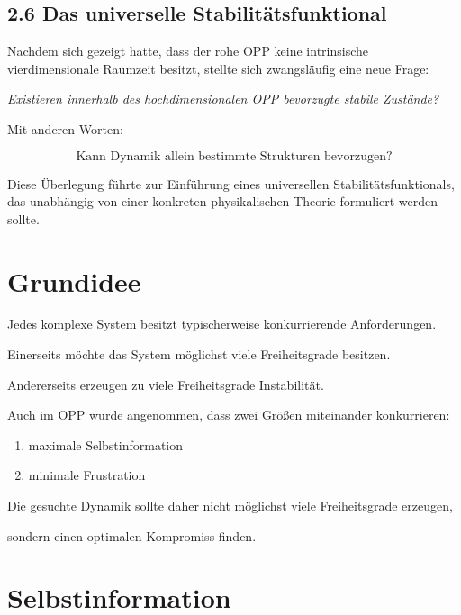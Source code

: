 \subsection{2.6 Das universelle Stabilitätsfunktional}

Nachdem sich gezeigt hatte, dass der rohe OPP keine intrinsische vierdimensionale Raumzeit besitzt, stellte sich zwangsläufig eine neue Frage:

\begin{center}
\emph{Existieren innerhalb des hochdimensionalen OPP bevorzugte stabile Zustände?}
\end{center}

Mit anderen Worten:

\[
\boxed{
\text{Kann Dynamik allein bestimmte Strukturen bevorzugen?}
}
\]

Diese Überlegung führte zur Einführung eines universellen Stabilitätsfunktionals, das unabhängig von einer konkreten physikalischen Theorie formuliert werden sollte.


\section*{Grundidee}

Jedes komplexe System besitzt typischerweise konkurrierende Anforderungen.

Einerseits möchte das System möglichst viele Freiheitsgrade besitzen.

Andererseits erzeugen zu viele Freiheitsgrade Instabilität.

Auch im OPP wurde angenommen, dass zwei Größen miteinander konkurrieren:

\begin{enumerate}

\item maximale Selbstinformation

\item minimale Frustration

\end{enumerate}

Die gesuchte Dynamik sollte daher nicht möglichst viele Freiheitsgrade erzeugen,

sondern einen optimalen Kompromiss finden.


\section*{Selbstinformation}

